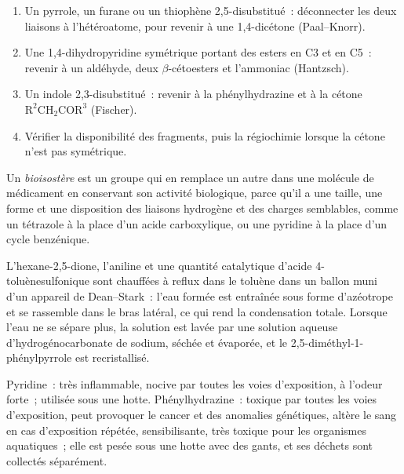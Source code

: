 \begin{method}\label{met:b3:heterocycles:disconnect}
\begin{enumerate}
  \item Un pyrrole, un furane ou un thiophène 2,5-disubstitué~: déconnecter
        les deux liaisons à l'hétéroatome, pour revenir à une 1,4-dicétone
        (Paal--Knorr).
  \item Une 1,4-dihydropyridine symétrique portant des esters en C3 et en C5~: revenir à un
        aldéhyde, deux $\beta$-cétoesters et l'ammoniac (Hantzsch).
  \item Un indole 2,3-disubstitué~: revenir à la phénylhydrazine et à la
        cétone
        $\mathrm{R^2CH_2COR^3}$ (Fischer).
  \item Vérifier la disponibilité des fragments, puis la régiochimie
        lorsque la cétone n'est pas symétrique.
\end{enumerate}
\end{method}

\begin{definition}[Bioisostère]\label{def:b3:heterocycles:bioisostere}
Un \emph{bioisostère} est un groupe qui en remplace un autre dans une
molécule de médicament en conservant son activité biologique, parce qu'il
a une taille, une forme et une disposition des liaisons hydrogène et des
charges semblables, comme un tétrazole à la place d'un acide carboxylique,
ou une pyridine à la place d'un cycle benzénique.
\end{definition}

\begin{inthelab}
L'hexane-2,5-dione, l'aniline et une quantité catalytique d'acide
4-toluènesulfonique sont chauffées à reflux dans le toluène dans un ballon
muni d'un appareil de Dean--Stark~: l'eau formée est entraînée sous forme
d'azéotrope et se rassemble dans le bras latéral, ce qui rend la
condensation totale. Lorsque l'eau ne se sépare plus, la solution est lavée
par une solution aqueuse d'hydrogénocarbonate de sodium, séchée et
évaporée, et le 2,5-diméthyl-1-phénylpyrrole est recristallisé.
\end{inthelab}

\begin{safety}{}
Pyridine~: très inflammable, nocive par toutes les voies d'exposition, à
l'odeur forte~; utilisée sous une hotte. Phénylhydrazine~: toxique par
toutes les voies d'exposition, peut provoquer le cancer et des anomalies
génétiques, altère le sang en cas d'exposition répétée, sensibilisante,
très toxique pour les organismes aquatiques~; elle est pesée sous une hotte
avec des gants, et ses déchets sont collectés séparément.
\end{safety}

